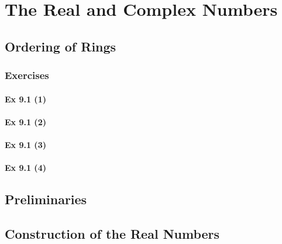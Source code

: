 \setcounter{chapter}{0}
\renewcommand{\thechapter}{9}
\chapter{The Real and Complex Numbers}\label{ch:9}
\setcounter{equation}{0}	        %

\section{Ordering of Rings}\label{sec:9.1}
\subsection{Exercises}\label{sec:9.1_Exercises}

\subsubsection{Ex 9.1 (1)}\label{sec:Ex_9.1.1}

\subsubsection{Ex 9.1 (2)}\label{sec:Ex_9.1.2}

\subsubsection{Ex 9.1 (3)}\label{sec:Ex_9.1.3}

\subsubsection{Ex 9.1 (4)}\label{sec:Ex_9.1.4}

\newpage		%

\section{Preliminaries}\label{sec:9.2}

\newpage		%

\section{Construction of the Real Numbers}\label{sec:9.3}
